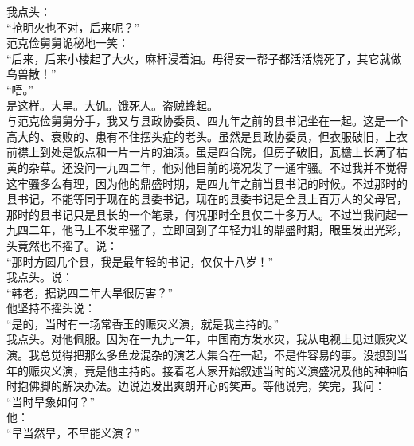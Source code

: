 我点头：\\

“抢明火也不对，后来呢？”\\

范克俭舅舅诡秘地一笑：\\

“后来，后来小楼起了大火，麻杆浸着油。毋得安一帮子都活活烧死了，其它就做鸟兽散！”\\

“唔。”\\

是这样。大旱。大饥。饿死人。盗贼蜂起。\\

与范克俭舅舅分手，我又与县政协委员、四九年之前的县书记坐在一起。这是一个高大的、衰败的、患有不住摆头症的老头。虽然是县政协委员，但衣服破旧，上衣前襟上到处是饭点和一片一片的油渍。虽是四合院，但房子破旧，瓦檐上长满了枯黄的杂草。还没问一九四二年，他对他目前的境况发了一通牢骚。不过我并不觉得这牢骚多么有理，因为他的鼎盛时期，是四九年之前当县书记的时候。不过那时的县书记，不能等同于现在的县委书记，现在的县委书记是全县上百万人的父母官，那时的县书记只是县长的一个笔录，何况那时全县仅二十多万人。不过当我问起一九四二年，他马上不发牢骚了，立即回到了年轻力壮的鼎盛时期，眼里发出光彩，头竟然也不摇了。说：\\

“那时方圆几个县，我是最年轻的书记，仅仅十八岁！”\\

我点头。说：\\

“韩老，据说四二年大旱很厉害？”\\

他坚持不摇头说：\\

“是的，当时有一场常香玉的赈灾义演，就是我主持的。”\\

我点头。对他佩服。因为在一九九一年，中国南方发水灾，我从电视上见过赈灾义演。我总觉得把那么多鱼龙混杂的演艺人集合在一起，不是件容易的事。没想到当年的赈灾义演，竟是他主持的。接着老人家开始叙述当时的义演盛况及他的种种临时抱佛脚的解决办法。边说边发出爽朗开心的笑声。等他说完，笑完，我问：\\

“当时旱象如何？”\\

他：\\

“旱当然旱，不旱能义演？”\\

